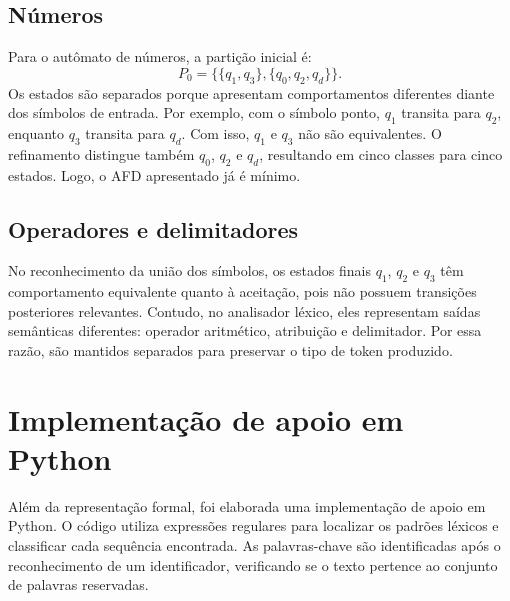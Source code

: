 \documentclass[12pt,a4paper]{article}
\begin{document}
\subsection{Números}

Para o autômato de números, a partição inicial é:
\[
    P_0 = \big\{\{q_1,q_3\},\{q_0,q_2,q_d\}\big\}.
\]
Os estados são separados porque apresentam comportamentos diferentes diante
dos símbolos de entrada. Por exemplo, com o símbolo ponto, $q_1$ transita
para $q_2$, enquanto $q_3$ transita para $q_d$. Com isso, $q_1$ e $q_3$ não
são equivalentes. O refinamento distingue também $q_0$, $q_2$ e $q_d$,
resultando em cinco classes para cinco estados. Logo, o AFD apresentado já
é mínimo.

\subsection{Operadores e delimitadores}

No reconhecimento da união dos símbolos, os estados finais $q_1$, $q_2$ e
$q_3$ têm comportamento equivalente quanto à aceitação, pois não possuem
transições posteriores relevantes. Contudo, no analisador léxico, eles
representam saídas semânticas diferentes: operador aritmético, atribuição e
delimitador. Por essa razão, são mantidos separados para preservar o tipo
de token produzido.

\section{Implementação de apoio em Python}

Além da representação formal, foi elaborada uma implementação de apoio em
Python. O código utiliza expressões regulares para localizar os padrões
léxicos e classificar cada sequência encontrada. As palavras-chave são
identificadas após o reconhecimento de um identificador, verificando se o
texto pertence ao conjunto de palavras reservadas.
\end{document}
